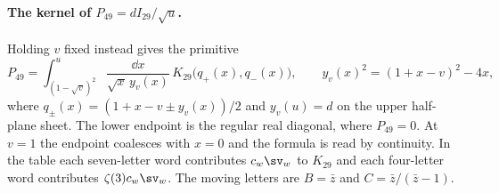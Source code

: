 \clearpage
\paragraph{The kernel of \(P_{49}=dI_{29}/\sqrt u\).}\label{app:i29kernel}
Holding \(v\) fixed instead gives the primitive
\[
 P_{49}=\int_{(1-\sqrt v)^2}^{u}\!
 \frac{\dd x}{\sqrt{x}\,y_v(x)}\,K_{29}\big(q_+(x),q_-(x)\big),
 \qquad y_v(x)^2=(1+x-v)^2-4x,
\]
where \(q_\pm(x)=(1+x-v\pm y_v(x))/2\) and \(y_v(u)=d\) on the
upper half-plane sheet. The lower endpoint is the regular real diagonal,
where \(P_{49}=0\). At \(v=1\) the endpoint coalesces with \(x=0\)
and the formula is read by continuity. In the table each seven-letter
word contributes \(c_w\sv_w\) to \(K_{29}\) and each four-letter word
contributes \(\zeta(3)c_w\sv_w\). The moving letters are
\(B=\bar z\) and \(C=\bar z/(\bar z-1)\).

